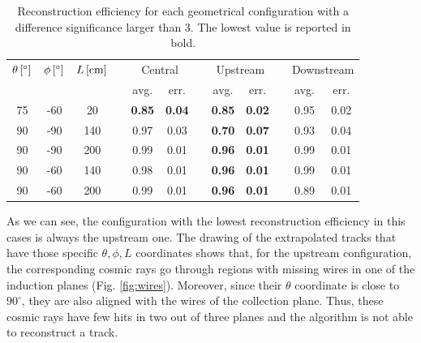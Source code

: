 \documentclass[a4paper]{scrartcl}
\renewcommand{\arraystretch}{1.2}
\newcommand{\ra}[1]{\renewcommand{\arraystretch}{#1}}
\begin{document}
\begin{table}[htbp]
  \centering
  \ra{1.2}
  \begin{tabular}{cccccccccccc}
    \toprule
    $\theta\thinspace[^\circ]$ & $\phi\thinspace[^\circ]$ & $L\thinspace[\mathrm{cm}]$ & \phantom{a} & \multicolumn{2}{c}{Central} & \phantom{a} & \multicolumn{2}{c}{Upstream} & \phantom{a} & \multicolumn{2}{c}{Downstream}\\
     \cmidrule{5-6} \cmidrule{8-9} \cmidrule{11-12}
      &  &  & & avg. & err. & & avg. & err. & & avg. & err.   \\
    \midrule
    75 & -60 & 20 & & \textbf{0.85} & \textbf{0.04} & & \textbf{0.85} & \textbf{0.02} & & 0.95 & 0.02\\
    90 & -90 & 140 & & 0.97 & 0.03 & & \textbf{0.70} & \textbf{0.07} & & 0.93 & 0.04\\
    90 & -90 & 200 & & 0.99 & 0.01 & & \textbf{0.96} & \textbf{0.01} & & 0.99 & 0.01\\
    90 & -60 & 140 & & 0.98 & 0.01 & & \textbf{0.96} & \textbf{0.01} & & 0.99 & 0.01\\
    90 & -60 & 200 & & 0.99 & 0.01 & & \textbf{0.96} & \textbf{0.01} & & 0.89 & 0.01\\

    \bottomrule
  \end{tabular}
  \caption{Reconstruction efficiency for each geometrical configuration with a difference significance larger than 3. The lowest value is reported in bold.}\label{tab:significance}
\end{table}

As we can see, the configuration with the lowest reconstruction efficiency in this cases is always the upstream one. The drawing of the extrapolated tracks that have those specific $\theta,\phi,L$ coordinates shows that, for the upstream configuration, the corresponding cosmic rays go through regions with missing wires in one of the induction planes (Fig. \ref{fig:wires}). Moreover, since their $\theta$ coordinate is close to $90^\circ$, they are also aligned with the wires of the collection plane. Thus, these cosmic rays have few hits in two out of three planes and the algorithm is not able to reconstruct a track.
\end{document}
